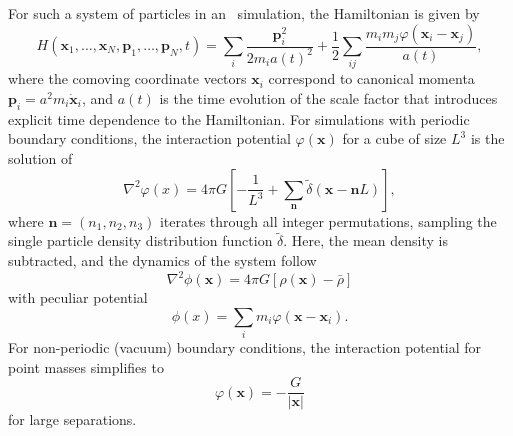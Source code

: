 For such a system of particles in an \nbody\ simulation, the Hamiltonian is given by
\begin{equation}
	H(\mathbf{x}_{1}, \ldots, \mathbf{x}_{N}, \mathbf{p}_{1}, \ldots, \mathbf{p}_{N}, t)
	= \sum_{i} \frac{\mathbf{p}_{i}^{2}}{2 m_{i} a(t)^{2}} + \frac{1}{2} \sum_{ij} \frac{m_{i} m_{j} \varphi(\mathbf{x}_{i} - \mathbf{x}_{j})}{a(t)},
\end{equation}
where the comoving coordinate vectors $\mathbf{x}_{i}$ correspond to canonical momenta $\mathbf{p}_{i} = a^{2} m_{i} \mathbf{\dot{x}}_{i}$, and $a(t)$ is the time evolution of the scale factor that introduces explicit time dependence to the Hamiltonian.  For simulations with periodic boundary conditions, the interaction potential $\varphi(\mathbf{x})$ for a cube of size $L^{3}$ is the solution of
\begin{equation} \label{eq:computational_theory--nbody_simulations--discrete_poisson}
	\nabla^{2} \varphi(x) = 4 \pi G \left[ -\frac{1}{L^{3}} + \sum_{\mathbf{n}} \tilde{\delta}(\mathbf{x} - \mathbf{n}L) \right],
\end{equation}
where $\mathbf{n} = (n_{1}, n_{2}, n_{3})$ iterates through all integer permutations, sampling the single particle density distribution function $\tilde{\delta}$.  Here, the mean density is subtracted, and the dynamics of the system follow
\begin{equation}
	\nabla^{2} \phi(\mathbf{x}) = 4 \pi G [\rho(\mathbf{x}) - \bar{\rho}]
\end{equation}
with peculiar potential
\begin{equation}
	\phi(x) = \sum_{i} m_{i} \varphi(\mathbf{x} - \mathbf{x}_{i}).
\end{equation}
For non-periodic (vacuum) boundary conditions, the interaction potential for point masses simplifies to 
\begin{equation}
	\varphi(\mathbf{x}) = -\frac{G}{|\mathbf{x}|}
\end{equation}
for large separations.

